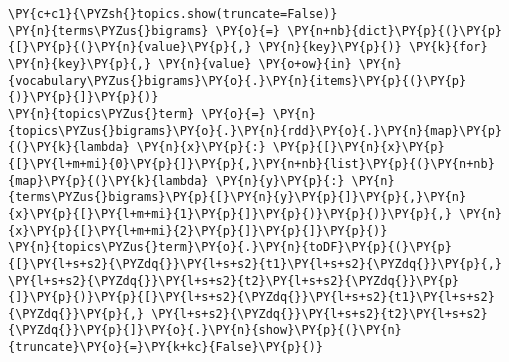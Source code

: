 \vspace{0.5cm}
   \begin{tcolorbox}[breakable, size=fbox, boxrule=1pt, pad at break*=1mm,colback=cellbackground, colframe=cellborder]
\begin{Verbatim}[commandchars=\\\{\}]
\PY{c+c1}{\PYZsh{}topics.show(truncate=False)}
\PY{n}{terms\PYZus{}bigrams} \PY{o}{=} \PY{n+nb}{dict}\PY{p}{(}\PY{p}{[}\PY{p}{(}\PY{n}{value}\PY{p}{,} \PY{n}{key}\PY{p}{)} \PY{k}{for} \PY{n}{key}\PY{p}{,} \PY{n}{value} \PY{o+ow}{in} \PY{n}{vocabulary\PYZus{}bigrams}\PY{o}{.}\PY{n}{items}\PY{p}{(}\PY{p}{)}\PY{p}{]}\PY{p}{)}
\PY{n}{topics\PYZus{}term} \PY{o}{=} \PY{n}{topics\PYZus{}bigrams}\PY{o}{.}\PY{n}{rdd}\PY{o}{.}\PY{n}{map}\PY{p}{(}\PY{k}{lambda} \PY{n}{x}\PY{p}{:} \PY{p}{[}\PY{n}{x}\PY{p}{[}\PY{l+m+mi}{0}\PY{p}{]}\PY{p}{,}\PY{n+nb}{list}\PY{p}{(}\PY{n+nb}{map}\PY{p}{(}\PY{k}{lambda} \PY{n}{y}\PY{p}{:} \PY{n}{terms\PYZus{}bigrams}\PY{p}{[}\PY{n}{y}\PY{p}{]}\PY{p}{,}\PY{n}{x}\PY{p}{[}\PY{l+m+mi}{1}\PY{p}{]}\PY{p}{)}\PY{p}{)}\PY{p}{,} \PY{n}{x}\PY{p}{[}\PY{l+m+mi}{2}\PY{p}{]}\PY{p}{]}\PY{p}{)}
\PY{n}{topics\PYZus{}term}\PY{o}{.}\PY{n}{toDF}\PY{p}{(}\PY{p}{[}\PY{l+s+s2}{\PYZdq{}}\PY{l+s+s2}{t1}\PY{l+s+s2}{\PYZdq{}}\PY{p}{,} \PY{l+s+s2}{\PYZdq{}}\PY{l+s+s2}{t2}\PY{l+s+s2}{\PYZdq{}}\PY{p}{]}\PY{p}{)}\PY{p}{[}\PY{l+s+s2}{\PYZdq{}}\PY{l+s+s2}{t1}\PY{l+s+s2}{\PYZdq{}}\PY{p}{,} \PY{l+s+s2}{\PYZdq{}}\PY{l+s+s2}{t2}\PY{l+s+s2}{\PYZdq{}}\PY{p}{]}\PY{o}{.}\PY{n}{show}\PY{p}{(}\PY{n}{truncate}\PY{o}{=}\PY{k+kc}{False}\PY{p}{)}
\end{Verbatim}
\end{tcolorbox}

